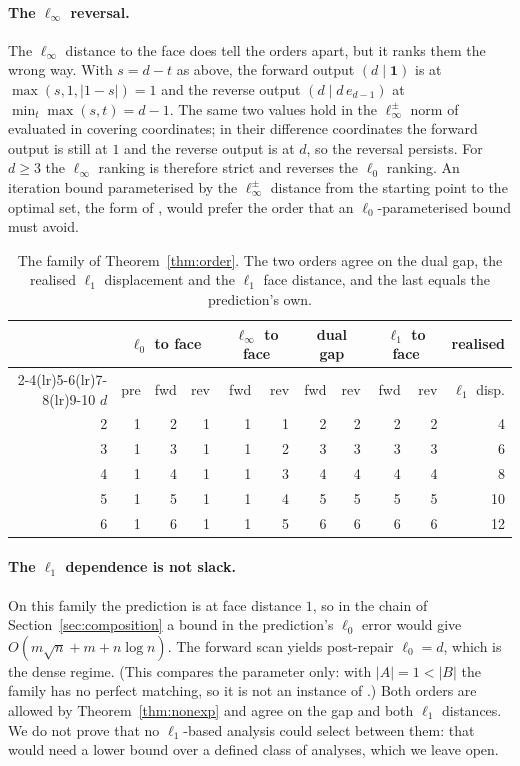 \paragraph{The $\ell_\infty$ reversal.} The $\ell_\infty$ distance to the face does tell the orders
apart, but it ranks them the wrong way. With $s = d - t$ as above, the forward output
$(d \mid \mathbf{1})$ is at $\max(s,1,|1-s|) = 1$ and the reverse output $(d \mid d\,e_{d-1})$ at
$\min_t \max(s,t) = d-1$. The same two values hold in the $\ell_\infty^\pm$ norm of
\citet{sakaue2022} evaluated in covering coordinates; in their difference coordinates the forward
output is still at $1$ and the reverse output is at $d$, so the reversal persists. For $d \ge 3$
the $\ell_\infty$ ranking is therefore strict and reverses the $\ell_0$ ranking. An iteration bound
parameterised by the $\ell_\infty^\pm$ distance from the starting point to the optimal set, the form
of \citet[Prop.~2]{sakaue2022}, would prefer the order that an $\ell_0$-parameterised bound must
avoid.

\begin{table}[ht]
\centering
\caption{The family of Theorem~\ref{thm:order}. The two orders agree on the dual gap, the realised $\ell_1$ displacement and the
$\ell_1$ face distance, and the last equals the prediction's own.}
\label{tab:order}
\small
\setlength{\tabcolsep}{4.5pt}
\begin{tabular}{rrrrrrrrrrr}
\toprule
& \multicolumn{3}{c}{$\ell_0$ to face} & \multicolumn{2}{c}{$\ell_\infty$ to face}
& \multicolumn{2}{c}{dual gap} & \multicolumn{2}{c}{$\ell_1$ to face} & realised\\
\cmidrule(lr){2-4}\cmidrule(lr){5-6}\cmidrule(lr){7-8}\cmidrule(lr){9-10}
$d$ & pre & fwd & rev & fwd & rev & fwd & rev & fwd & rev & $\ell_1$ disp.\\
\midrule
2 & 1 & 2 & 1 & 1 & 1 & 2 & 2 & 2 & 2 & 4\\
3 & 1 & 3 & 1 & 1 & 2 & 3 & 3 & 3 & 3 & 6\\
4 & 1 & 4 & 1 & 1 & 3 & 4 & 4 & 4 & 4 & 8\\
5 & 1 & 5 & 1 & 1 & 4 & 5 & 5 & 5 & 5 & 10\\
6 & 1 & 6 & 1 & 1 & 5 & 6 & 6 & 6 & 6 & 12\\
\bottomrule
\end{tabular}
\end{table}

\paragraph{The $\ell_1$ dependence is not slack.} On this family the prediction is at face
distance $1$, so in the chain of Section~\ref{sec:composition} a bound in the prediction's $\ell_0$
error would give $O(m\sqrt{n} + m + n\log n)$. The forward scan yields post-repair $\ell_0 = d$,
which is the dense regime. (This compares the parameter only: with $|A| = 1 < |B|$ the family has no
perfect matching, so it is not an instance of \citet[Thm.~3.2]{chen2022}.) Both orders are allowed
by Theorem~\ref{thm:nonexp} and agree on the gap and both $\ell_1$ distances. We do not prove that no
$\ell_1$-based analysis could select between them: that would need a lower bound over a defined
class of analyses, which we leave open.


